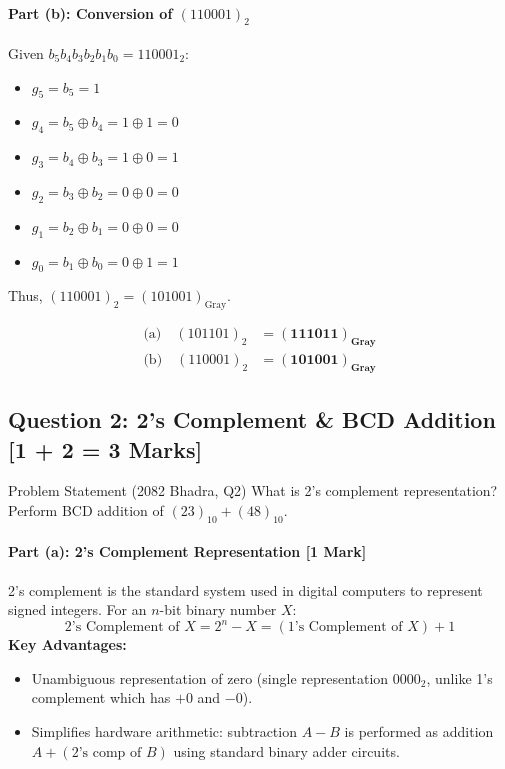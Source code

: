 \documentclass[11pt,a4paper,oneside]{book}
\begin{document}
\paragraph{Part (b): Conversion of $(110001)_2$}
Given $b_5 b_4 b_3 b_2 b_1 b_0 = 110001_2$:
\begin{itemize}
  \item $g_5 = b_5 = 1$
  \item $g_4 = b_5 \oplus b_4 = 1 \oplus 1 = 0$
  \item $g_3 = b_4 \oplus b_3 = 1 \oplus 0 = 1$
  \item $g_2 = b_3 \oplus b_2 = 0 \oplus 0 = 0$
  \item $g_1 = b_2 \oplus b_1 = 0 \oplus 0 = 0$
  \item $g_0 = b_1 \oplus b_0 = 0 \oplus 1 = 1$
\end{itemize}
Thus, $(110001)_2 = (101001)_{\text{Gray}}$.

\begin{answerbox}
\begin{align*}
\text{(a)}\quad (101101)_2 &= \mathbf{(111011)_{\text{Gray}}} \\
\text{(b)}\quad (110001)_2 &= \mathbf{(101001)_{\text{Gray}}}
\end{align*}
\end{answerbox}

\vspace{0.6cm}

\subsection{Question 2: 2's Complement \& BCD Addition [1 + 2 = 3 Marks]}
\begin{questionbox}{Problem Statement (2082 Bhadra, Q2)}
What is 2's complement representation? Perform BCD addition of $(23)_{10} + (48)_{10}$.
\end{questionbox}

\paragraph{Part (a): 2's Complement Representation [1 Mark]}
2's complement is the standard system used in digital computers to represent signed integers. For an $n$-bit binary number $X$:
\[
\text{2's Complement of } X = 2^n - X = (\text{1's Complement of } X) + 1
\]
\textbf{Key Advantages:}
\begin{itemize}
  \item Unambiguous representation of zero (single representation $0000_2$, unlike 1's complement which has $+0$ and $-0$).
  \item Simplifies hardware arithmetic: subtraction $A - B$ is performed as addition $A + (\text{2's comp of } B)$ using standard binary adder circuits.
\end{itemize}
\end{document}
